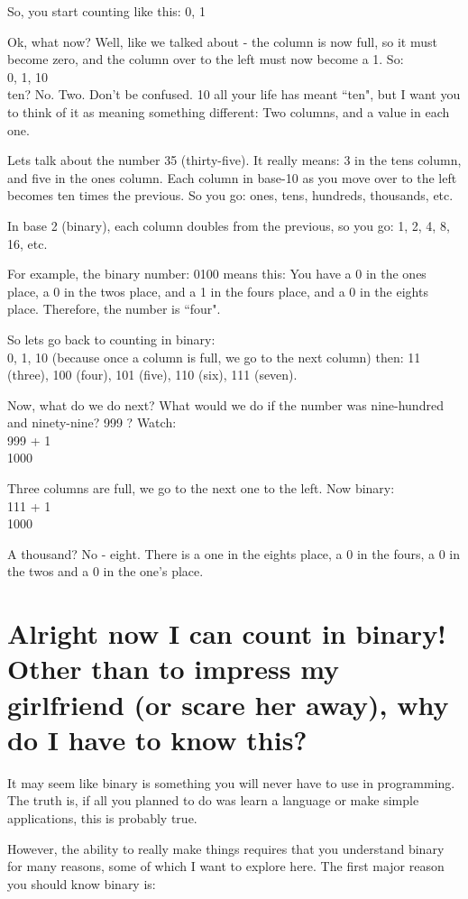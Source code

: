 \documentclass[a4paper,12pt]{article}
\let\stdsection\section
\renewcommand\section{\newpage\stdsection}
\begin{document}
So, you start counting like this: 0, 1

Ok, what now? Well, like we talked about - the column is now full, so it must become zero, and the column over to the left must now become a 1. So:
\\0, 1, 10
\\ten? No. Two. Don't be confused. 10 all your life has meant ``ten", but I want you to think of it as meaning something different: Two columns, and a value in each one.

Lets talk about the number 35 (thirty-five). It really means: 3 in the tens column, and five in the ones column. Each column in base-10 as you move over to the left becomes ten times the previous. So you go: ones, tens, hundreds, thousands, etc.

In base 2 (binary), each column doubles from the previous, so you go: 1, 2, 4, 8, 16, etc.

For example, the binary number: 0100 means this: You have a 0 in the ones place, a 0 in the twos place, and a 1 in the fours place, and a 0 in the eights place. Therefore, the number is ``four".

So lets go back to counting in binary:
\\0, 1, 10 (because once a column is full, we go to the next column) then: 11 (three), 100 (four), 101 (five), 110 (six), 111 (seven).

Now, what do we do next? What would we do if the number was nine-hundred and ninety-nine? 999 ? Watch:
\\999 + 1
\\1000

Three columns are full, we go to the next one to the left. Now binary:
\\111 + 1
\\1000

A thousand? No - eight. There is a one in the eights place, a 0 in the fours, a 0 in the twos and a 0 in the one's place.

\section{Alright now I can count in binary! Other than to impress my girlfriend (or scare her away), why do I have to know this?}
It may seem like binary is something you will never have to use in programming. The truth is, if all you planned to do was learn a language or make simple applications, this is probably true.

However, the ability to really make things requires that you understand binary for many reasons, some of which I want to explore here. The first major reason you should know binary is:
\end{document}
